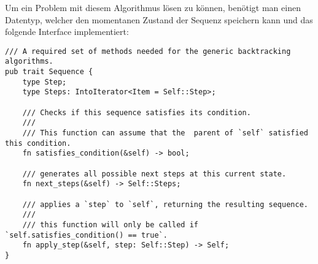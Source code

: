 Um ein Problem mit diesem Algorithmus lösen zu können, benötigt man einen Datentyp, welcher den momentanen Zustand
der Sequenz speichern kann und das folgende Interface implementiert:
\begin{verbatim}
/// A required set of methods needed for the generic backtracking algorithms.
pub trait Sequence {
    type Step;
    type Steps: IntoIterator<Item = Self::Step>;

    /// Checks if this sequence satisfies its condition.
    ///
    /// This function can assume that the  parent of `self` satisfied this condition.
    fn satisfies_condition(&self) -> bool;

    /// generates all possible next steps at this current state.
    fn next_steps(&self) -> Self::Steps;

    /// applies a `step` to `self`, returning the resulting sequence.
    ///
    /// this function will only be called if `self.satisfies_condition() == true`.
    fn apply_step(&self, step: Self::Step) -> Self;
}
\end{verbatim}